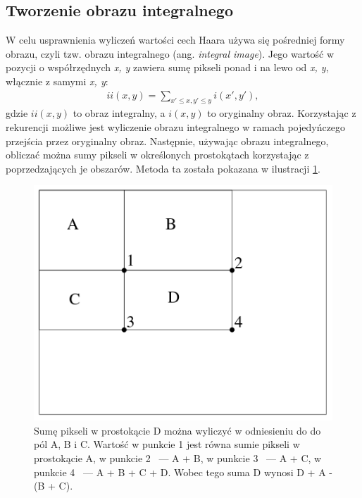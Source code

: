 \documentclass[12pt,a4paper,leqno,oneside,titlepage]{book}
\begin{document}
\subsection{Tworzenie obrazu integralnego}

W celu usprawnienia wyliczeń wartości cech Haara używa się pośredniej formy obrazu, czyli tzw. obrazu integralnego (ang. \textit{integral image}). Jego wartość w pozycji o współrzędnych \textit{x, y} zawiera sumę pikseli ponad i na lewo od \textit{x, y}, włącznie z samymi \textit{x, y}:
\begin{align}
ii(x,y) = \sum_{x'\leqslant x, y' \leqslant y} i(x', y'),
\end{align}
gdzie $ii(x,y)$ to obraz integralny, a $i(x,y)$ to oryginalny obraz. Korzystając z rekurencji możliwe jest wyliczenie obrazu integralnego w ramach pojedyńczego przejścia przez oryginalny obraz. Następnie, używając obrazu integralnego, obliczać można sumy pikseli w określonych prostokątach korzystając z poprzedzających je obszarów. Metoda ta została pokazana w ilustracji \ref{fig:integral_image_sums}.

\begin{figure}[!tbp]
  \centering
  \begin{minipage}[b]{0.4\textheight}
    \includegraphics[width=\textwidth]{pictures/integral_image_sums.png}
  \end{minipage}
  \caption{Sumę pikseli w prostokącie D można wyliczyć w odniesieniu do do pól A, B i C. Wartość w punkcie 1 jest równa sumie pikseli w prostokącie A, w punkcie 2 ~--- A + B, w punkcie 3 ~--- A + C, w punkcie 4 ~--- A + B + C + D. Wobec tego suma D wynosi D + A - (B + C).\cite{ViolaJones01}}
  \label{fig:integral_image_sums}
\end{figure}
\end{document}
